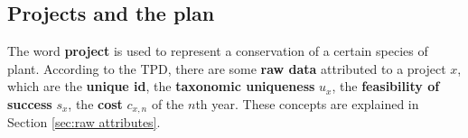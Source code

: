 \documentclass{article}
\begin{document}
\begin{comment}
$$(u_p \in A_p,(p=1,2,\cdots,n-1))$$

Through this recursion formula, we can find $F_n$ in terms of $F_1$:

\begin{equation}
\begin{split}
	F_n&=F_{n-2}-\sum_{i=1}^{n-2} \sum_{u_i} E_{u_i}^{(n-2)-i+1}-\sum_{i=1}^{n-1} \sum_{u_i} E_{u_i}^{(n-1)-i+1}+\alpha+\alpha=F_{n-3}-\cdots+3\alpha\\
	&=F_1-\sum_{j=1}^{n-1} \sum_{i=1}^{j}\sum_{u_i} E_{u_i}^{j-i+1}+(n-1)\alpha=k+\sum_{j=1}^{n-1} {\sum_{i=1}^{j} \sum_{u_i} E_{u_i}^{j-i+1}+n\alpha},
\end{split}
\end{equation}
where $u_p \in A_p$, and $p=1,2,\cdots,n-1)$.

Therefore, by using $(1)$, we can get a series of constraints:

$$F_P>C_p,(p=1,2,\cdots,n)$$
\begin{equation}
k+\sum_{j=1}^{p-1} {\sum_{i=1}^j}{\sum_{u_i}}E_{u_i}^{p-i+1}+p\alpha>\sum_{i=1}^p {\sum_{u_i} E_{u_i}^{p-i+1}},(p=1,2,\cdots,n)
\end{equation}
\begin{equation}
k+\sum_{j=1}^{p-1} {\sum_{i=1}^j}{\sum_{u_i}}E_{u_i}^{p-i+1}+p\frac{\sigma}{I}>\sum_{i=1}^p {\sum_{u_i} E_{u_i}^{p-i+1}},(p=1,2,\cdots,n)
\end{equation}

\par Under these constraints, in order to give the best plan for plant conservation, we need to find the greatest value of $\zeta$ $(9)$:
\begin{equation}
	\zeta = \frac{\sum_x (B_x \cdot U_x \cdot _{S_x})}{(\sum_x \sum_{v=1}^{T_x})\cdot I},(x \in {Q_i} \subset Z=\bigcup\limits_{t=1}^{n} A_t)
\end{equation}
\end{comment}

\subsection{Projects and the plan}
\label{sec:projects and the plan}

The word \textbf{project} is used to represent a conservation of a certain species of plant.
According to the TPD, there are some \textbf{raw data} attributed to a project $x$, which are
the \textbf{unique id}, the \textbf{taxonomic uniqueness} $u_x$, the \textbf{feasibility of success} $s_x$, the \textbf{cost} $c_{x,n}$ of the $n$th year.
These concepts are explained in Section \ref{sec:raw attributes}.
\end{document}
